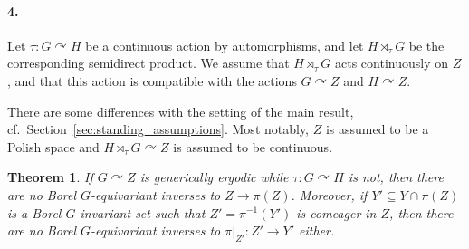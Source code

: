 \documentclass[12pt]{paper}
\numberwithin{equation}{section}
\theoremstyle{plain}
\newtheorem{theorem}{Theorem}[section]
\theoremstyle{definition}
\newcommand{\acts}{\curvearrowright}
\begin{document}
\paragraph{4.}
Let \(\tau : G \acts H\) be a continuous action by automorphisms, and let \(H \rtimes_{\tau} G\) be
the corresponding semidirect product.  We assume that \(H \rtimes_{\tau} G\) acts continuously on
\(Z\), and that this action is compatible with the actions \(G \acts Z\) and \(H \acts Z\).

\bigskip

There are some differences with the setting of the main result,
cf.~Section~\ref{sec:standing_assumptions}. Most notably, \(Z\) is assumed to be a Polish space and
\(H \rtimes_{\tau} G \acts Z\) is assumed to be continuous.



\begin{theorem}
  \label{thm:sufficient-condition}
  If \(G \acts Z\) is generically ergodic while \(\tau:G\acts H\) is not, then there are no Borel
  \(G\)-equivariant inverses to \(Z \to \pi(Z)\).  Moreover, if \(Y' \subseteq Y \cap \pi(Z)\) is a
  Borel \(G\)-invariant set such that \(Z' = \pi^{-1}(Y')\) is comeager in \(Z\), then there are no
  Borel \(G\)-equivariant inverses to \(\pi|_{Z'} : Z' \to Y'\) either.
\end{theorem}
\end{document}
